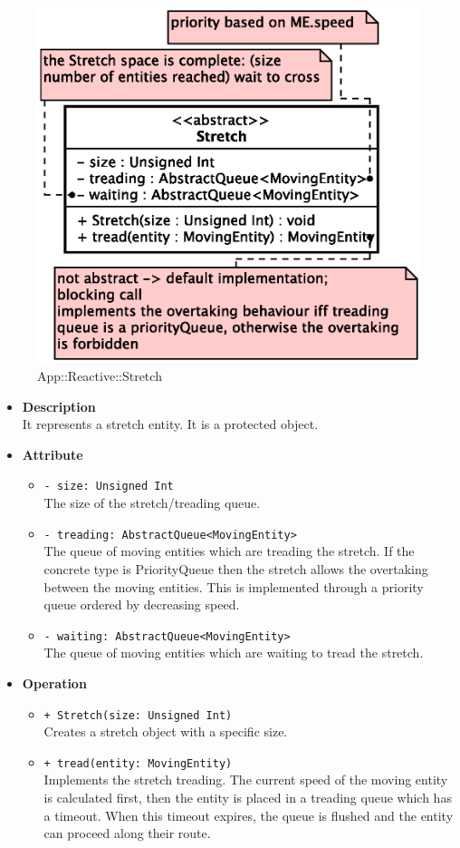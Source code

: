 \begin{figure}[h]
\centering
\includegraphics[scale=0.6,keepaspectratio]{images/solution/stretch.eps}
\caption{App::Reactive::Stretch}
\label{fig:sd-app-stretch}
\end{figure}
\FloatBarrier
\begin{itemize}
  \item \textbf{Description} \\
    It represents a stretch entity. It is a protected object.
  \item \textbf{Attribute}
  \begin{itemize}
    \item \texttt{- size: Unsigned Int} \\
The size of the stretch/treading queue.
    \item \texttt{- treading: AbstractQueue<MovingEntity>} \\
The queue of moving entities which are treading the stretch. If the concrete type
is PriorityQueue then the stretch allows the overtaking between the moving entities.
This is implemented through a priority queue ordered by decreasing speed.
    \item \texttt{- waiting: AbstractQueue<MovingEntity>} \\
The queue of moving entities which are waiting to tread the stretch. 
  \end{itemize}
  \item \textbf{Operation}
  \begin{itemize}
    \item \texttt{+ Stretch(size: Unsigned Int)} \\
Creates a stretch object with a specific size.
    \item \texttt{+ tread(entity: MovingEntity)} \\
Implements the stretch treading. The current speed of the moving entity
is calculated first, then the entity is placed in a treading queue which has a  
timeout. When this timeout expires, the queue is flushed and the entity can
proceed along their route.
  \end{itemize}
\end{itemize}
